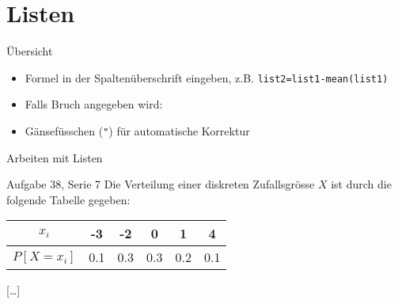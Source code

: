 \documentclass[handout]{beamer}
\newlength{\tikey}
\newcommand{\keystroke}[1]{\settowidth{\tikey}{\scriptsize #1}\psframebox[framearc=0.2]{\parbox{\tikey}{\scriptsize #1}}}
\begin{document}
%

\section{Listen}
\begin{frame}{Übersicht}
\begin{itemize}
\item Formel in der Spaltenüberschrift eingeben, z.B. \texttt{list2=list1-mean(list1)}
\item Falls Bruch angegeben wird: \keystroke{$\Diamondblack$}~\keystroke{ENTER}
\item Gänsefüsschen (\texttt{"}) für automatische Korrektur
\end{itemize}
\end{frame}

\begin{frame}{Arbeiten mit Listen}
\begin{beamerboxesrounded}[shadow]{Aufgabe 38, Serie 7}
Die Verteilung einer diskreten Zufallsgrösse $X$ ist durch die folgende Tabelle gegeben:

\begin{center}\begin{tabular}{c|ccccc}\toprule
$x_i$ & -3 & -2 &  0 & 1 & 4\\\midrule
$P[X = x_i ]$ &  0.1 & 0.3 & 0.3 & 0.2 & 0.1\\\bottomrule
\end{tabular}\end{center}

[\dots]
\end{beamerboxesrounded}
\end{frame}
\end{document}
